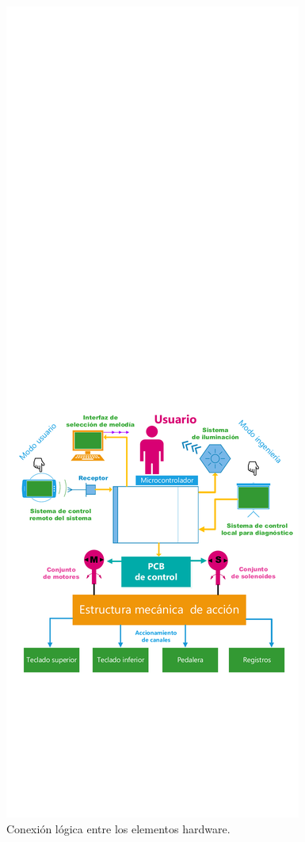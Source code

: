 \begin{figure}[H]
	\noindent \begin{centering}
		\includegraphics[width=\linewidth*3/4]{capitulo3/general}
		\par\end{centering}
	\smallskip
	\caption{\label{fig:general} Conexión lógica entre los elementos hardware.}
\end{figure} 

